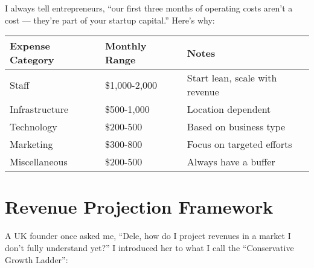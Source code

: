 I always tell entrepreneurs, ``our first three months of operating costs aren't a cost --- they're part of your startup capital.'' Here's why:

\begin{center}
\begin{tabularx}{\textwidth}{>{\raggedright\arraybackslash}X >{\centering\arraybackslash}X >{\raggedright\arraybackslash}X}
    \toprule
    \textbf{Expense Category} & \textbf{Monthly Range} & \textbf{Notes} \\
    \midrule
    Staff & \$1,000-2,000 & Start lean, scale with revenue \\
    Infrastructure & \$500-1,000 & Location dependent \\
    Technology & \$200-500 & Based on business type \\
    Marketing & \$300-800 & Focus on targeted efforts \\
    Miscellaneous & \$200-500 & Always have a buffer \\
    \bottomrule
\end{tabularx}
\end{center}

\section{Revenue Projection Framework}\label{sec:revenue-projection}

A UK founder once asked me, ``Dele, how do I project revenues in a market I don't fully understand yet?'' I introduced her to what I call the ``Conservative Growth Ladder'':

